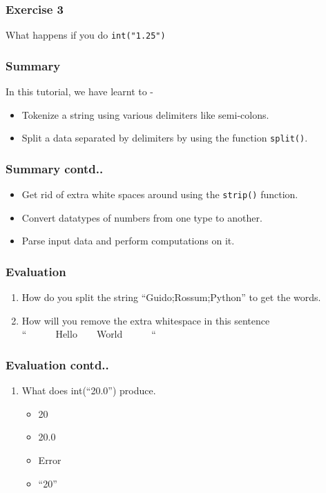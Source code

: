 \documentclass[17pt,compress]{beamer}
\newcounter{saveenumi}
\newcommand{\seti}{\setcounter{saveenumi}{\value{enumi}}}
\newcommand{\conti}{\setcounter{enumi}{\value{saveenumi}}}
\begin{document}
\begin{frame}
\frametitle{Exercise 3}
\label{sec-8}

  What happens if you do \texttt{int("1.25")}
\end{frame}
\begin{frame}
\frametitle{Summary}
\label{sec-9.1}
In this tutorial, we have learnt to -
\begin{itemize}
\item Tokenize a string using various delimiters like semi-colons.
\item Split a data separated by delimiters by using the function \texttt{split()}.
\end{itemize}
\end{frame}
\begin{frame}
\frametitle{Summary contd..}
\label{sec-9.2}
\begin{itemize}
\item Get rid of extra white spaces around using the \texttt{strip()} function.
\item Convert datatypes of numbers from one type to another.
\item Parse input data and perform computations on it.
\end{itemize}
\end{frame}
\begin{frame}
\frametitle{Evaluation}
\label{sec-10.1}

\begin{enumerate}
\item How do you split the string ``Guido;Rossum;Python'' to get the words.\pause
\item How will you remove the extra whitespace in this sentence\\
     ``~~~~~~Hello~~~~World~~~~~~``
\seti
\end{enumerate}
\end{frame}
\begin{frame}
\frametitle{Evaluation contd..}
\label{sec-10.2}
\begin{enumerate}    
\conti
\item What does int(``20.0'') produce.\pause
\begin{itemize}
\item 20
\item 20.0
\item Error
\item ``20''
\end{itemize}
\end{enumerate}
\end{frame}
\end{document}
